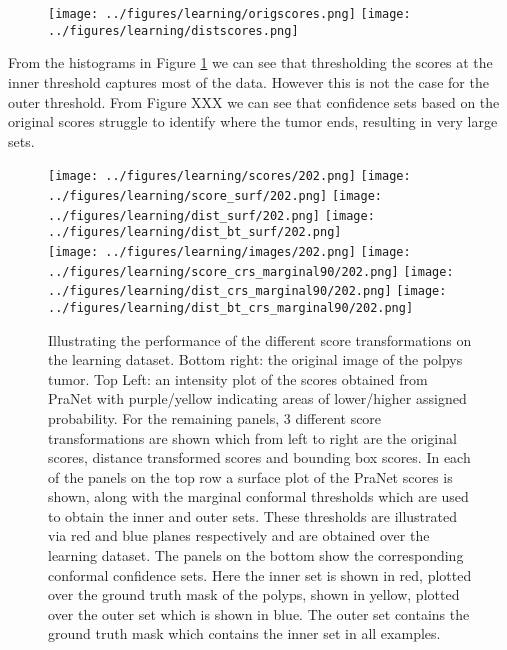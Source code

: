 \begin{figure}
		\centering
		\texttt{[image: ../figures/learning/origscores.png]}
		\texttt{[image: ../figures/learning/distscores.png]}
		\label{scorehists}
\end{figure}
From the histograms in Figure \ref{scorehists} we can see that thresholding the scores at the inner threshold captures most of the data. However this is not the case for the outer threshold. From Figure XXX we can see that confidence sets based on the original scores struggle to identify where the tumor ends, resulting in very large sets. 

\begin{figure}
\begin{center}
	\texttt{[image: ../figures/learning/scores/202.png]}
		\texttt{[image: ../figures/learning/score\_surf/202.png]}	\texttt{[image: ../figures/learning/dist\_surf/202.png]}
		\texttt{[image: ../figures/learning/dist\_bt\_surf/202.png]}\\
		\texttt{[image: ../figures/learning/images/202.png]}
	\texttt{[image: ../figures/learning/score\_crs\_marginal90/202.png]}
	\texttt{[image: ../figures/learning/dist\_crs\_marginal90/202.png]}
	\texttt{[image: ../figures/learning/dist\_bt\_crs\_marginal90/202.png]}
\end{center}
	\caption{Illustrating the performance of the different score transformations on the learning dataset. Bottom right: the original image of the polpys tumor. Top Left: an intensity plot of the scores obtained from PraNet with purple/yellow indicating areas of lower/higher assigned probability. For the remaining panels, 3 different score transformations are shown which from left to right are the original scores, distance transformed scores and bounding box scores. In each of the panels on the top row a surface plot of the PraNet scores is shown, along with the marginal conformal thresholds which are used to obtain the inner and outer sets.  These thresholds are illustrated via red and blue planes respectively and are obtained over the learning dataset. The panels on the bottom show the corresponding conformal confidence sets. Here the inner set is shown in red, plotted over the ground truth mask of the polyps, shown in yellow, plotted over the outer set which is shown in blue. The outer set contains the ground truth mask which contains the inner set in all examples.}
	\label{fig:learning}
\end{figure}


